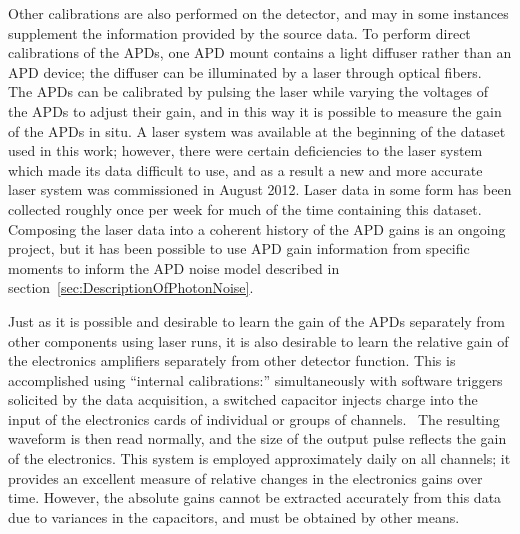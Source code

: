 Other calibrations are also performed on the detector, and may in some instances supplement the information provided by the source data.  To perform direct calibrations of the APDs, one APD mount contains a light diffuser rather than an APD device; the diffuser can be illuminated by a laser through optical fibers.~\cite{detectorPartI}  The APDs can be calibrated by pulsing the laser while varying the voltages of the APDs to adjust their gain, and in this way it is possible to measure the gain of the APDs in situ.  A laser system was available at the beginning of the dataset used in this work; however, there were certain deficiencies to the laser system which made its data difficult to use, and as a result a new and more accurate laser system was commissioned in August 2012.  Laser data in some form has been collected roughly once per week for much of the time containing this dataset.  Composing the laser data into a coherent history of the APD gains is an ongoing project, but it has been possible to use APD gain information from specific moments to inform the APD noise model described in section~\ref{sec:DescriptionOfPhotonNoise}.

Just as it is possible and desirable to learn the gain of the APDs separately from other components using laser runs, it is also desirable to learn the relative gain of the electronics amplifiers separately from other detector function.  This is accomplished using ``internal calibrations:'' simultaneously with software triggers solicited by the data acquisition, a switched capacitor injects charge into the input of the electronics cards of individual or groups of channels.~\cite{EXOElectronicsFunctionalSpecification}  The resulting waveform is then read normally, and the size of the output pulse reflects the gain of the electronics.  This system is employed approximately daily on all channels; it provides an excellent measure of relative changes in the electronics gains over time.  However, the absolute gains cannot be extracted accurately from this data due to variances in the capacitors, and must be obtained by other means.

